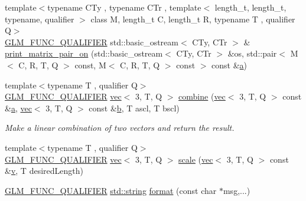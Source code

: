 \begin{DoxyCompactItemize}
\item 
{\footnotesize template$<$typename C\+Ty , typename C\+Tr , template$<$ length\+\_\+t, length\+\_\+t, typename, qualifier $>$ class M, length\+\_\+t C, length\+\_\+t R, typename T , qualifier Q$>$ }\\\hyperlink{setup_8hpp_a33fdea6f91c5f834105f7415e2a64407}{G\+L\+M\+\_\+\+F\+U\+N\+C\+\_\+\+Q\+U\+A\+L\+I\+F\+I\+ER} std\+::basic\+\_\+ostream$<$ C\+Ty, C\+Tr $>$ \& \hyperlink{namespaceglm_1_1detail_a5b82ceb67c3495960b07267d105170c5}{print\+\_\+matrix\+\_\+pair\+\_\+on} (std\+::basic\+\_\+ostream$<$ C\+Ty, C\+Tr $>$ \&os, std\+::pair$<$ M$<$ C, R, T, Q $>$ const, M$<$ C, R, T, Q $>$ const $>$ const \&\hyperlink{_s_d_l__opengl__glext_8h_a3309789fc188587d666cda5ece79cf82}{a})
\item 
{\footnotesize template$<$typename T , qualifier Q$>$ }\\\hyperlink{setup_8hpp_a33fdea6f91c5f834105f7415e2a64407}{G\+L\+M\+\_\+\+F\+U\+N\+C\+\_\+\+Q\+U\+A\+L\+I\+F\+I\+ER} \hyperlink{structglm_1_1vec}{vec}$<$ 3, T, Q $>$ \hyperlink{namespaceglm_1_1detail_a62c6df7a0862562560f4ff00b215f4e6}{combine} (\hyperlink{structglm_1_1vec}{vec}$<$ 3, T, Q $>$ const \&\hyperlink{_s_d_l__opengl__glext_8h_a3309789fc188587d666cda5ece79cf82}{a}, \hyperlink{structglm_1_1vec}{vec}$<$ 3, T, Q $>$ const \&\hyperlink{_s_d_l__opengl__glext_8h_a0f71581a41fd2264c8944126dabbd010}{b}, T ascl, T bscl)
\begin{DoxyCompactList}\small\item\em Make a linear combination of two vectors and return the result. \end{DoxyCompactList}\item 
{\footnotesize template$<$typename T , qualifier Q$>$ }\\\hyperlink{setup_8hpp_a33fdea6f91c5f834105f7415e2a64407}{G\+L\+M\+\_\+\+F\+U\+N\+C\+\_\+\+Q\+U\+A\+L\+I\+F\+I\+ER} \hyperlink{structglm_1_1vec}{vec}$<$ 3, T, Q $>$ \hyperlink{namespaceglm_1_1detail_ab5e74c51452215027ae64d0ef1731f9c}{scale} (\hyperlink{structglm_1_1vec}{vec}$<$ 3, T, Q $>$ const \&\hyperlink{_s_d_l__opengl_8h_a10a82eabcb59d2fcd74acee063775f90}{v}, T desired\+Length)
\item 
\hyperlink{setup_8hpp_a33fdea6f91c5f834105f7415e2a64407}{G\+L\+M\+\_\+\+F\+U\+N\+C\+\_\+\+Q\+U\+A\+L\+I\+F\+I\+ER} \hyperlink{_s_d_l__opengl__glext_8h_ae84541b4f3d8e1ea24ec0f466a8c568b}{std\+::string} \hyperlink{namespaceglm_1_1detail_acd5305bbd1c5417b1eb770faf8229d14}{format} (const char $\ast$msg,...)
\end{DoxyCompactItemize}


